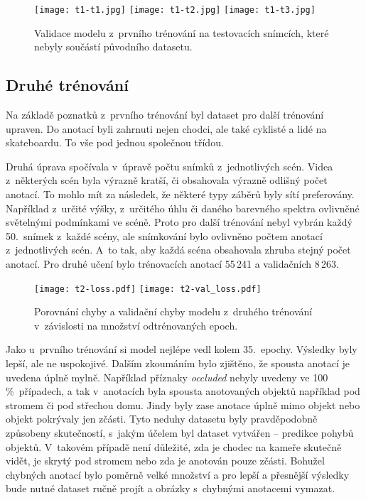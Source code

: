 \begin{figure}[H]
    \centering
    \texttt{[image: t1-t1.jpg]}\hfill
    \texttt{[image: t1-t2.jpg]}\hfill
    \texttt{[image: t1-t3.jpg]}
    \caption[Validace modelu z~prvního trénování na testovacích snímcích]{Validace modelu z~prvního trénování na testovacích snímcích, které nebyly součástí původního datasetu.}
    \label{fig_train1_test_img}
\end{figure}


\subsection*{Druhé trénování}

Na základě poznatků z~prvního trénování byl dataset pro další trénování upraven. Do anotací byli zahrnuti nejen chodci, ale také cyklisté a lidé na skateboardu. To vše pod jednou společnou třídou.

Druhá úprava spočívala v~úpravě počtu snímků z~jednotlivých scén. Videa z~některých scén byla výrazně kratší, či obsahovala výrazně odlišný počet anotací. To mohlo mít za následek, že některé typy záběrů byly sítí preferovány. Například z~určité výšky, z~určitého úhlu či daného barevného spektra ovlivněné světelnými podmínkami ve scéně. Proto pro další trénování nebyl vybrán každý 50.~snímek z~každé scény, ale snímkování bylo ovlivněno počtem anotací z~jednotlivých scén. A~to tak, aby každá scéna obsahovala zhruba stejný počet anotací. Pro druhé učení bylo trénovacích anotací 55\,241 a validačních 8\,263.

\begin{figure}[H]
    \centering
    \texttt{[image: t2-loss.pdf]}\hfill
    \texttt{[image: t2-val\_loss.pdf]}
    \caption[Chyba a validační chyba druhého trénování]{Porovnání chyby a validační chyby modelu z~druhého trénování v~závislosti na množství odtrénovaných epoch.}
    \label{fig_train2_graph}
\end{figure}

Jako u~prvního trénování si model nejlépe vedl kolem 35.~epochy. Výsledky byly lepší, ale ne uspokojivé. Dalším zkoumáním bylo zjištěno, že spousta anotací je uvedena úplně mylně. Například příznaky \textit{occluded} nebyly uvedeny ve 100\,\%~případech, a tak v~anotacích byla spousta anotovaných objektů například pod stromem či pod střechou domu. Jindy byly zase anotace úplně mimo objekt nebo objekt pokrývaly jen zčásti. Tyto neduhy datasetu byly pravděpodobně způsobeny skutečností, s~jakým účelem byl dataset vytvářen -- predikce pohybů objektů. V~takovém případě není důležité, zda je chodec na kameře skutečně vidět, je skrytý pod stromem nebo zda je anotován pouze zčásti. Bohužel chybných anotací bylo poměrně velké množství a pro lepší a přesnější výsledky bude nutné dataset ručně projít a obrázky s~chybnými anotacemi vymazat.

